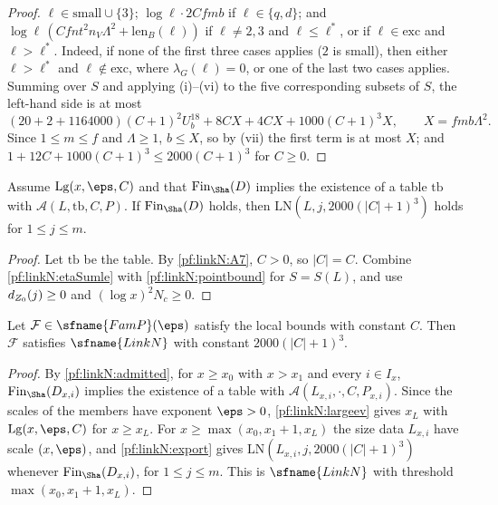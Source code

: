 \begin{proof}
$\ell\in\mathrm{small}\cup\{3\}$; $\log\ell\cdot2Cfmb$ if $\ell\in\{q,d\}$; and $\log\ell\,(Cfnt^2n_V\Lambda^2+\mathrm{len}_B(\ell))$ if
$\ell\ne2,3$ and $\ell\le\ell^*$, or if $\ell\in\mathrm{exc}$ and $\ell>\ell^*$. Indeed, if none of the first three cases applies
($2$ is small), then either $\ell>\ell^*$ and $\ell\notin\mathrm{exc}$, where $\lambda_G(\ell)=0$, or one of the last two cases
applies. Summing over $S$ and applying (i)--(vi) to the five corresponding subsets of $S$, the left-hand side is at most
\[
(20+2+1164000)(C+1)^2U_b^{18}+8CX+4CX+1000(C+1)^3X,\qquad X=fmb\Lambda^2 .
\]
Since $1\le m\le f$ and $\Lambda\ge1$, $b\le X$, so by (vii) the first term is at most $X$; and $1+12C+1000(C+1)^3\le2000(C+1)^3$
for $C\ge0$.
\end{proof}

\begin{proposition}\label{pf:linkN:export}
Assume $\mathrm{Lg}(x,\eps,C)$ and that $\linkNfin(D)$ implies the existence of a table $\mathrm{tb}$ with
$\mathcal A(L,\mathrm{tb},C,P)$. If $\linkNfin(D)$ holds, then $\mathrm{LN}(L,j,2000(|C|+1)^3)$ holds for $1\le j\le m$.
\end{proposition}

\begin{proof}
Let $\mathrm{tb}$ be the table. By \ref{pf:linkN:A7}, $C>0$, so $|C|=C$. Combine \cref{pf:linkN:etaSumle} with
\cref{pf:linkN:pointbound} for $S=S(L)$, and use $d_{Z_0}(j)\ge0$ and $(\log x)^2N_c\ge0$.
\end{proof}

\begin{theorem}[Summation]\label{pf:linkN:sumthm}
Let $\mathcal F\in\sfname{FamP}(\eps)$ satisfy the local bounds with constant $C$. Then $\mathcal F$ satisfies $\sfname{LinkN}$ with
constant $2000(|C|+1)^3$.
\end{theorem}

\begin{proof}
By \cref{pf:linkN:admitted}, for $x\ge x_0$ with $x>x_1$ and every $i\in I_x$, $\linkNfin(D_{x,i})$ implies the existence of a
table with $\mathcal A(L_{x,i},\cdot,C,P_{x,i})$. Since the scales of the members have exponent $\eps>0$,
\cref{pf:linkN:largeev} gives $x_L$ with $\mathrm{Lg}(x,\eps,C)$ for $x\ge x_L$. For $x\ge\max(x_0,x_1+1,x_L)$ the size data
$L_{x,i}$ have scale $(x,\eps)$, and \cref{pf:linkN:export} gives $\mathrm{LN}(L_{x,i},j,2000(|C|+1)^3)$ whenever
$\linkNfin(D_{x,i})$, for $1\le j\le m$. This is $\sfname{LinkN}$ with threshold $\max(x_0,x_1+1,x_L)$.
\end{proof}

